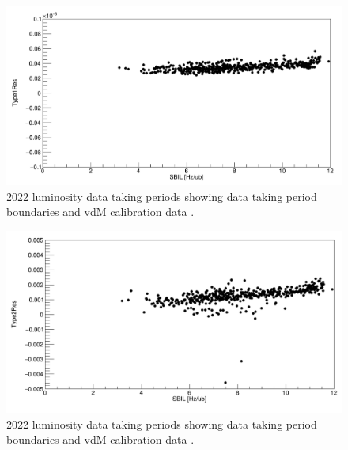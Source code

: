 \begin{figure}[!htp]
\centering
\includegraphics[width=1\textwidth]{ashish_thesis/2022_type1res.png}
\caption[2018 CMS luminosity data taking periods.]{%
  2022 luminosity data taking periods showing data taking period boundaries and vdM calibration data  \cite{CERNLumiPublicResults}.
}
\label{fig:period_bound}
\end{figure}



\begin{figure}[!htp]
\centering
\includegraphics[width=1\textwidth]{ashish_thesis/2022_type2res.png}
\caption[2018 CMS luminosity data taking periods.]{%
  2022 luminosity data taking periods showing data taking period boundaries and vdM calibration data  \cite{CERNLumiPublicResults}.
}
\label{fig:period_bound}
\end{figure}










